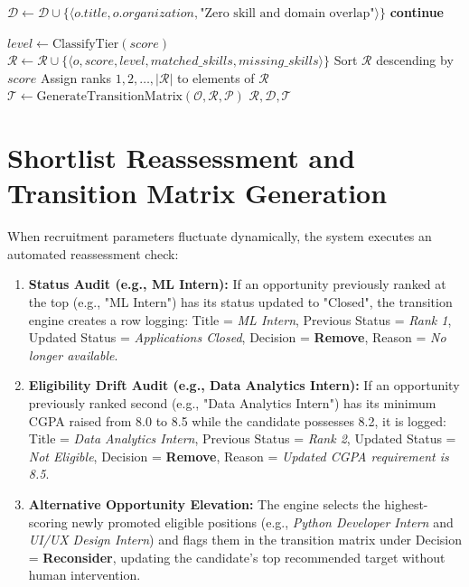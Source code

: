 \begin{algorithm}[h!]
\begin{algorithmic}[1]
        \State $\mathcal{D} \gets \mathcal{D} \cup \{\langle o.title, o.organization, \text{"Zero skill and domain overlap"} \rangle\}$
        \State \textbf{continue}
    \EndIf
    
    \State $level \gets \text{ClassifyTier}(score)$
    \State $\mathcal{R} \gets \mathcal{R} \cup \{\langle o, score, level, matched\_skills, missing\_skills \rangle\}$
\EndFor
\State Sort $\mathcal{R}$ descending by $score$
\State Assign ranks $1, 2, \dots, |\mathcal{R}|$ to elements of $\mathcal{R}$
\State $\mathcal{T} \gets \text{GenerateTransitionMatrix}(\mathcal{O}, \mathcal{R}, \mathcal{P})$
\State \Return $\mathcal{R}, \mathcal{D}, \mathcal{T}$
\end{algorithmic}
\end{algorithm}

\section{Shortlist Reassessment and Transition Matrix Generation} \label{S4.3}
When recruitment parameters fluctuate dynamically, the system executes an automated reassessment check:
\begin{enumerate}[label=\textbf{\alph*)}]
	\item \textbf{Status Audit (e.g., ML Intern):} If an opportunity previously ranked at the top (e.g., "ML Intern") has its status updated to "Closed", the transition engine creates a row logging: Title = \textit{ML Intern}, Previous Status = \textit{Rank 1}, Updated Status = \textit{Applications Closed}, Decision = \textbf{Remove}, Reason = \textit{No longer available}.
	\item \textbf{Eligibility Drift Audit (e.g., Data Analytics Intern):} If an opportunity previously ranked second (e.g., "Data Analytics Intern") has its minimum CGPA raised from 8.0 to 8.5 while the candidate possesses 8.2, it is logged: Title = \textit{Data Analytics Intern}, Previous Status = \textit{Rank 2}, Updated Status = \textit{Not Eligible}, Decision = \textbf{Remove}, Reason = \textit{Updated CGPA requirement is 8.5}.
	\item \textbf{Alternative Opportunity Elevation:} The engine selects the highest-scoring newly promoted eligible positions (e.g., \textit{Python Developer Intern} and \textit{UI/UX Design Intern}) and flags them in the transition matrix under Decision = \textbf{Reconsider}, updating the candidate's top recommended target without human intervention.
\end{enumerate}

